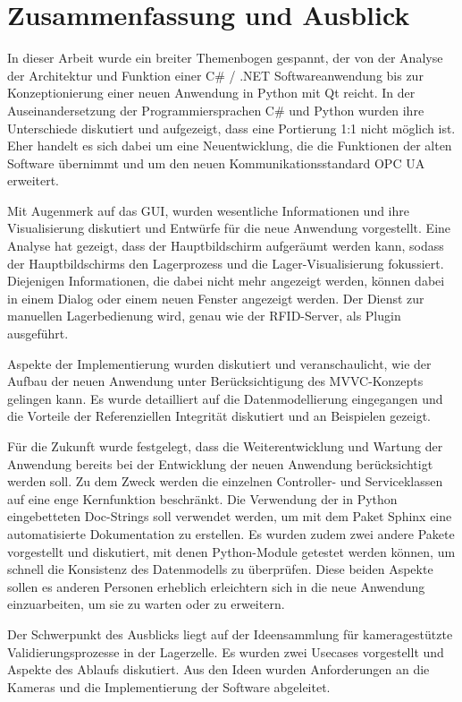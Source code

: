 \chapter{Zusammenfassung und Ausblick}

In dieser Arbeit wurde ein breiter Themenbogen gespannt, der von der Analyse der Architektur und Funktion einer C$\#$ / .NET Softwareanwendung bis zur
Konzeptionierung einer neuen Anwendung in Python mit Qt reicht.
In der Auseinandersetzung der Programmiersprachen C$\#$ und Python wurden ihre Unterschiede diskutiert und aufgezeigt, dass eine Portierung 1:1 nicht möglich ist.
Eher handelt es sich dabei um eine Neuentwicklung, die die Funktionen der alten Software übernimmt und um den neuen Kommunikationsstandard OPC UA erweitert.

Mit Augenmerk auf das GUI, wurden wesentliche Informationen und ihre Visualisierung diskutiert und Entwürfe für die neue Anwendung vorgestellt. 
Eine Analyse hat gezeigt, dass der Hauptbildschirm aufgeräumt werden kann, sodass der Hauptbildschirms den Lagerprozess und die Lager-Visualisierung
fokussiert. 
Diejenigen Informationen, die dabei nicht mehr angezeigt werden, können dabei in einem Dialog oder einem neuen Fenster angezeigt werden.
Der Dienst zur manuellen Lagerbedienung wird, genau wie der RFID-Server, als Plugin ausgeführt.

Aspekte der Implementierung wurden diskutiert und veranschaulicht, wie der Aufbau der neuen Anwendung unter Berücksichtigung des MVVC-Konzepts gelingen kann. 
Es wurde detailliert auf die Datenmodellierung eingegangen und die Vorteile der Referenziellen Integrität diskutiert und an Beispielen gezeigt.

Für die Zukunft wurde festgelegt, dass die Weiterentwicklung und Wartung der Anwendung bereits bei der Entwicklung der neuen Anwendung berücksichtigt werden soll. 
Zu dem Zweck werden die einzelnen Controller- und Serviceklassen auf eine enge Kernfunktion beschränkt. 
Die Verwendung der in Python eingebetteten Doc-Strings soll verwendet werden, um mit dem Paket Sphinx eine automatisierte Dokumentation zu erstellen.
Es wurden zudem zwei andere Pakete vorgestellt und diskutiert, mit denen Python-Module getestet werden können, um schnell die Konsistenz des Datenmodells zu überprüfen.
Diese beiden Aspekte sollen es anderen Personen erheblich erleichtern sich in die neue Anwendung einzuarbeiten, um sie zu warten oder zu erweitern.

Der Schwerpunkt des Ausblicks liegt auf der Ideensammlung für kameragestützte Validierungsprozesse in der Lagerzelle.
Es wurden zwei Usecases vorgestellt und Aspekte des Ablaufs diskutiert.
Aus den Ideen wurden Anforderungen an die Kameras und die Implementierung der Software abgeleitet.

